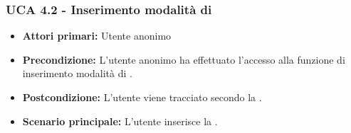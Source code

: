 \subsubsection{UCA 4.2 - Inserimento modalità di }%
\begin{itemize}
	\item \textbf{Attori primari:} Utente anonimo
	\item \textbf{Precondizione:} L'utente anonimo ha effettuato l'accesso alla funzione di inserimento modalità di .
	\item \textbf{Postcondizione:} L'utente viene tracciato secondo la .
	\item \textbf{Scenario principale:} L'utente inserisce la .
\end{itemize}
